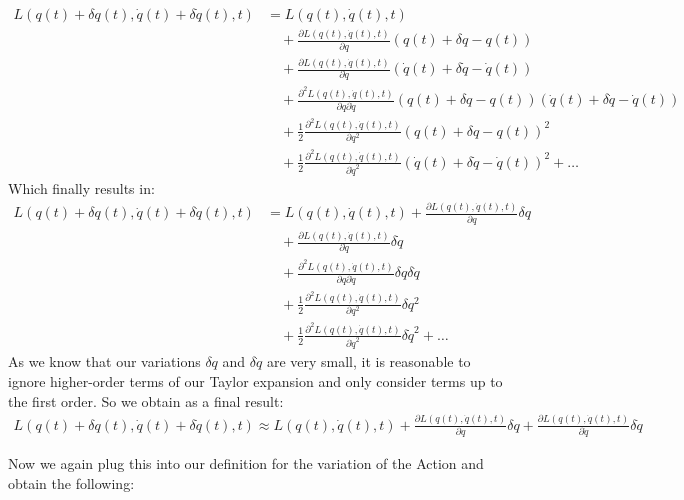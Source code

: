\begin{align*}
    L(q(t)+\delta q(t), \dot{q}(t)+\delta \dot{q}(t), t) &= L(q(t),\dot{q}(t),t) \\
    &\quad + \frac{\partial L(q(t),\dot{q}(t), t)}{\partial q}(q(t)+\delta q-q(t)) \\
    &\quad + \frac{\partial L(q(t),\dot{q}(t), t)}{\partial \dot{q}}(\dot{q}(t)+\delta \dot{q}-\dot{q}(t)) \\
    &\quad + \frac{\partial^2 L(q(t),\dot{q}(t), t)}{\partial q \partial \dot{q}}(q(t)+\delta q-q(t))(\dot{q}(t)+\delta \dot{q}-\dot{q}(t)) \\
    &\quad + \frac{1}{2}\frac{\partial^2 L(q(t),\dot{q}(t), t)}{\partial q^2}(q(t)+\delta q-q(t))^2 \\
    &\quad + \frac{1}{2}\frac{\partial^2 L(q(t),\dot{q}(t), t)}{\partial \dot{q}^2}(\dot{q}(t)+\delta \dot{q}-\dot{q}(t))^2+\dots
\end{align*}
Which finally results in:
\begin{align*}
    L(q(t)+\delta q(t), \dot{q}(t)+\delta \dot{q}(t), t) &= L(q(t),\dot{q}(t),t) + \frac{\partial L(q(t),\dot{q}(t), t)}{\partial q}\delta q \\
    &\quad + \frac{\partial L(q(t),\dot{q}(t), t)}{\partial \dot{q}}\delta \dot{q} \\
    &\quad + \frac{\partial^2 L(q(t),\dot{q}(t), t)}{\partial q \partial \dot{q}}\delta q\delta \dot{q} \\
    &\quad + \frac{1}{2}\frac{\partial^2 L(q(t),\dot{q}(t), t)}{\partial q^2}\delta q^2 \\
    &\quad + \frac{1}{2}\frac{\partial^2 L(q(t),\dot{q}(t), t)}{\partial \dot{q}^2}\delta \dot{q}^2+\dots
\end{align*}
As we know that our variations $\delta q$ and $\delta \dot{q}$ are very small, it is reasonable to ignore higher-order terms of our Taylor expansion and only consider terms up to the first order.
So we obtain as a final result:
\begin{align*}
    L(q(t)+\delta q(t), \dot{q}(t)+\delta \dot{q}(t), t) \approx L(q(t),\dot{q}(t),t) + \frac{\partial L(q(t),\dot{q}(t), t)}{\partial q}\delta q + \frac{\partial L(q(t),\dot{q}(t), t)}{\partial \dot{q}}\delta \dot{q}
\end{align*}

    Now we again plug this into our definition for the variation of the Action and obtain the following:
    
